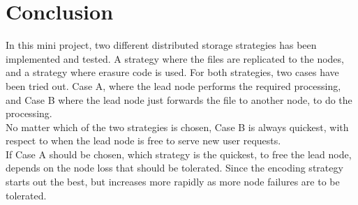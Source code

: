 \section{Conclusion} \label{sec:conc}

In this mini project, two different distributed storage strategies has been implemented and tested. A strategy where the files are replicated to the nodes, and a strategy where erasure code is used. For both strategies, two cases have been tried out. Case A, where the lead node performs the required processing, and Case B where the lead node just forwards the file to another node, to do the processing.\\
No matter which of the two strategies is chosen, Case B is always quickest, with respect to when the lead node is free to serve new user requests. \\
If Case A should be chosen, which strategy is the quickest, to free the lead node, depends on the node loss that should be tolerated. Since the encoding strategy starts out the best, but increases more rapidly as more node failures are to be tolerated.\\
